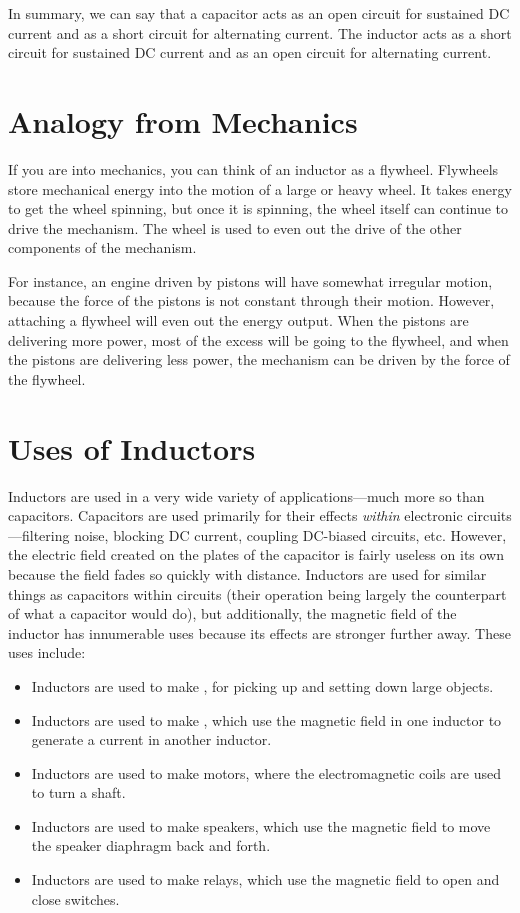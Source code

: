 In summary, we can say that a capacitor acts as an open circuit for sustained DC current and as a short circuit for alternating current.
The inductor acts as a short circuit for sustained DC current and as an open circuit for alternating current.

\section{Analogy from Mechanics}

If you are into mechanics, you can think of an inductor as a flywheel.
Flywheels store mechanical energy into the motion of a large or heavy wheel.
It takes energy to get the wheel spinning, but once it is spinning, the wheel itself can continue to drive the mechanism.
The wheel is used to even out the drive of the other components of the mechanism.

For instance, an engine driven by pistons will have somewhat irregular motion, because the force of the pistons is not constant through their motion.
However, attaching a flywheel will even out the energy output. 
When the pistons are delivering more power, most of the excess will be going to the flywheel, and when the pistons are delivering less power, the mechanism can be driven by the force of the flywheel.

\section{Uses of Inductors}

Inductors are used in a very wide variety of applications---much more so than capacitors.
Capacitors are used primarily for their effects \emph{within} electronic circuits---filtering noise, blocking DC current, coupling DC-biased circuits, etc.
However, the electric field created on the plates of the capacitor is fairly useless on its own because the field fades so quickly with distance.
Inductors are used for similar things as capacitors within circuits (their operation being largely the counterpart of what a capacitor would do), but additionally, the magnetic field of the inductor has innumerable uses because its effects are stronger further away.
These uses include:

\begin{itemize}
\item Inductors are used to make , for picking up and setting down large objects.  
\item Inductors are used to make , which use the magnetic field in one inductor to generate a current in another inductor.
\item Inductors are used to make motors, where the electromagnetic coils are used to turn a shaft.
\item Inductors are used to make speakers, which use the magnetic field to move the speaker diaphragm back and forth.
\item Inductors are used to make relays, which use the magnetic field to open and close switches.
\end{itemize}

